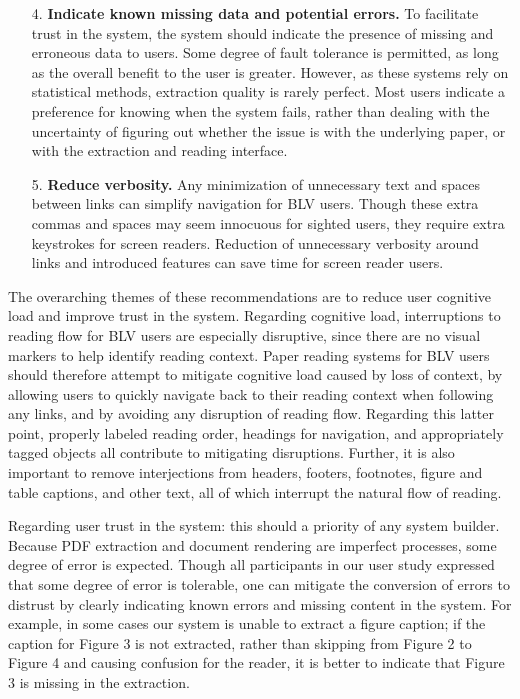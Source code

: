\begin{enumerate}[itemsep=4pt]
    \item[4.] \textbf{Indicate known missing data and potential errors.} To facilitate trust in the system, the system should indicate the presence of missing and erroneous data to users. Some degree of fault tolerance is permitted, as long as the overall benefit to the user is greater. However, as these systems rely on statistical methods, extraction quality is rarely perfect. Most users indicate a preference for knowing when the system fails, rather than dealing with the uncertainty of figuring out whether the issue is with the underlying paper, or with the extraction and reading interface.

    \item[5.] \textbf{Reduce verbosity.} Any minimization of unnecessary text and spaces between links can simplify navigation for BLV users. Though these extra commas and spaces may seem innocuous for sighted users, they require extra keystrokes for screen readers. Reduction of unnecessary verbosity around links and introduced features can save time for screen reader users.

\end{enumerate}

The overarching themes of these recommendations are to reduce user cognitive load and improve trust in the system. Regarding cognitive load, interruptions to reading flow for BLV users are especially disruptive, since there are no visual markers to help identify reading context. Paper reading systems for BLV users should therefore attempt to mitigate cognitive load caused by loss of context, by allowing users to quickly navigate back to their reading context when following any links, and by avoiding any disruption of reading flow. Regarding this latter point, properly labeled reading order, headings for navigation, and appropriately tagged objects all contribute to mitigating disruptions. Further, it is also important to remove interjections from headers, footers, footnotes, figure and table captions, and other text, all of which interrupt the natural flow of reading.

Regarding user trust in the system: this should a priority of any system builder. Because PDF extraction and document rendering are imperfect processes, some degree of error is expected. Though all participants in our user study expressed that some degree of error is tolerable, one can mitigate the conversion of errors to distrust by clearly indicating known errors and missing content in the system. For example, in some cases our system is unable to extract a figure caption; if the caption for Figure 3 is not extracted, rather than skipping from Figure 2 to Figure 4 and causing confusion for the reader, it is better to indicate that Figure 3 is missing in the extraction.


